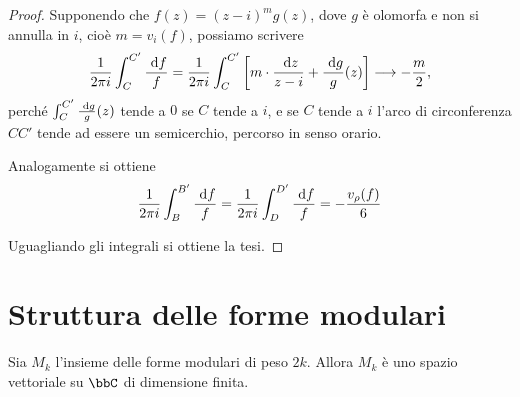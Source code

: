 \begin{proof}
	Supponendo che $f(z)=(z-i)^mg(z)$, dove $g$ è olomorfa e non si annulla in $i$, cioè $m=v_i(f)$, possiamo scrivere
	\begin{equation}
		\frac{1}{2\pi i}\int_C^{C'}\frac{\de f}{f} = \frac{1}{2\pi i}\int_C^{C'}\left[ m\cdot\frac{\de z}{z-i} + %
		\frac{\de g}{g}(z) \right] \longrightarrow -\frac{m}{2},
	\end{equation}
	perché $\int_C^{C'}\frac{\text{ d} g}{g}(z)$ tende a $0$ se $C$ tende a $i$, e se $C$ tende a $i$ l'arco di circonferenza $CC'$ tende ad essere un semicerchio, percorso in senso orario.
	
	Analogamente si ottiene 
	\begin{equation}
		\frac{1}{2\pi i}\int_B^{B'}\frac{\text{ d} f}{f}=\frac{1}{2\pi i}\int_D^{D'}\frac{\text{ d} f}{f}=-\frac{v_\rho(f)}{6}
	\end{equation}
	
	Uguagliando gli integrali si ottiene la tesi.
\end{proof}

\section{Struttura delle forme modulari}

\begin{corollario}
	Sia $M_k$ l'insieme delle forme modulari di peso $2k$. Allora $M_k$ è uno spazio vettoriale su $\bbC$ di dimensione finita.
\end{corollario}

